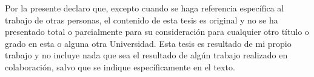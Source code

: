 
\begin{declaration}

Por la presente declaro que, excepto cuando se haga referencia específica al trabajo de otras personas, el contenido de esta tesis es original y no se ha presentado total o parcialmente para su consideración para cualquier otro título o grado en esta o alguna otra Universidad. Esta tesis es resultado de mi propio trabajo y no incluye nada que sea el resultado de algún trabajo realizado en colaboración, salvo que se indique específicamente en el texto.


\end{declaration}
